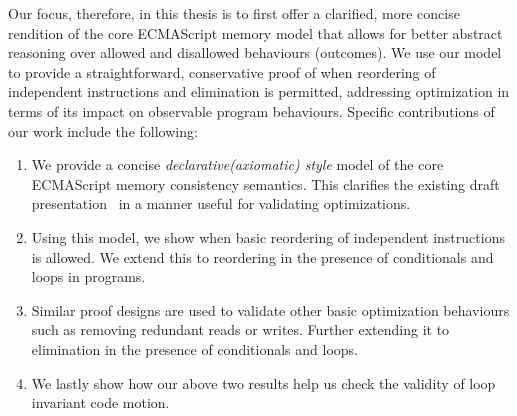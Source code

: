     Our focus, therefore, in this thesis is to first offer a clarified, more concise rendition of the core ECMAScript memory model that allows for better abstract reasoning over allowed and disallowed behaviours (outcomes). 
    We use our model to provide a straightforward, conservative proof of when reordering of independent instructions and elimination is permitted, addressing optimization in terms of its impact on observable program behaviours. 
    Specific contributions of our work include the following:
    
    \begin{enumerate}
        \item We provide a concise \textit{declarative(axiomatic) style} model of the core ECMAScript memory consistency semantics. This clarifies the existing draft presentation~\cite{ECMA} in a manner useful for validating optimizations.
        \item Using this model, we show when basic reordering of independent instructions is allowed. We extend this to reordering in the presence of conditionals and loops in programs.
        \item Similar proof designs are used to validate other basic optimization behaviours such as removing redundant reads or writes. Further extending it to elimination in the presence of conditionals and loops. 
        \item We lastly show how our above two results help us check the validity of loop invariant code motion. 
    \end{enumerate}
  